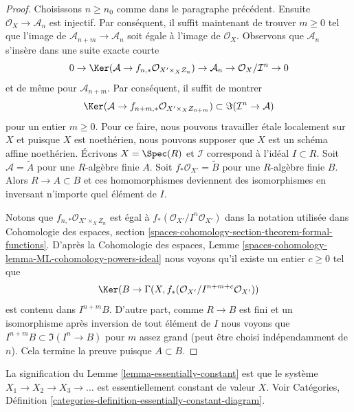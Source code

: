 \begin{proof}
\medskip\noindent
Choisissons $n \geq n_0$ comme dans le paragraphe précédent. Ensuite
$\mathcal{O}_X \to \mathcal{A}_n$ est injectif. Par conséquent, il suffit maintenant de trouver $m \geq 0$ tel que l'image de
$\mathcal{A}_{n + m} \to \mathcal{A}_n$ soit égale à l'image de $\mathcal{O}_X$. Observons que $\mathcal{A}_n$
s'insère dans une suite exacte courte
$$
0 \to \Ker(\mathcal{A} \to f_{n, *}\mathcal{O}_{X' \times_X Z_n})
\to \mathcal{A}_n \to \mathcal{O}_X/\mathcal{I}^n \to 0
$$
et de même pour $\mathcal{A}_{n + m}$. Par conséquent, il suffit de montrer
$$
\Ker(\mathcal{A} \to f_{n + m, *}\mathcal{O}_{X' \times_X Z_{n + m}})
\subset
\Im(\mathcal{I}^n \to \mathcal{A})
$$
pour un entier $m \geq 0$. Pour ce faire, nous pouvons travailler \'etale localement sur
$X$ et puisque $X$ est noethérien, nous pouvons supposer que $X$ est
un schéma affine noethérien. Écrivons $X = \Spec(R)$ et $\mathcal{I}$
correspond à l'idéal $I \subset R$. Soit $\mathcal{A} = \widetilde{A}$
pour une $R$-algèbre finie $A$. Soit $f_*\mathcal{O}_{X'} = \widetilde{B}$
pour une $R$-algèbre finie $B$. Alors $R \to A \subset B$ et ces homomorphismes deviennent des isomorphismes en inversant n'importe quel élément de $I$.

\medskip\noindent
Notons que $f_{n, *}\mathcal{O}_{X' \times_X Z_n}$
est égal à $f_*(\mathcal{O}_{X'}/I^n\mathcal{O}_{X'})$
dans la notation utilisée dans Cohomologie des espaces, section
\ref{spaces-cohomology-section-theorem-formal-functions}.
D'après la Cohomologie des espaces, Lemme
\ref{spaces-cohomology-lemma-ML-cohomology-powers-ideal}
nous voyons qu'il existe un entier $c \geq 0$ tel que
$$
\Ker(B \to \Gamma(X, f_*(\mathcal{O}_{X'}/I^{n + m + c}\mathcal{O}_{X'}))
$$
est contenu dans $I^{n + m}B$. D'autre part, comme $R \to B$ est
fini et un isomorphisme après inversion de tout élément de $I$
nous voyons que $I^{n + m}B \subset \Im(I^n \to B)$ pour $m$ assez grand
(peut être choisi indépendamment de $n$). Cela termine la preuve puisque $A \subset B$.
\end{proof}

\begin{remark}
\label{remark-essentially-constant}
La signification du Lemme \ref{lemma-essentially-constant}
est que le système $X_1 \to X_2 \to X_3 \to \ldots$ est essentiellement
constant de valeur $X$. Voir Catégories, Définition
\ref{categories-definition-essentially-constant-diagram}.
\end{remark}






